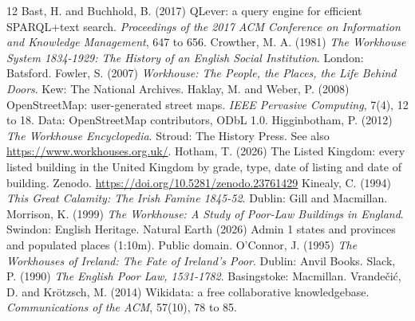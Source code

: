 \documentclass[11pt,a4paper]{article}
\begin{document}
\begin{thebibliography}{12}
 Bast, H. and Buchhold, B. (2017) QLever: a query engine for efficient SPARQL+text search. \emph{Proceedings of the 2017 ACM Conference on Information and Knowledge Management}, 647 to 656.
 Crowther, M. A. (1981) \emph{The Workhouse System 1834-1929: The History of an English Social Institution}. London: Batsford.
 Fowler, S. (2007) \emph{Workhouse: The People, the Places, the Life Behind Doors}. Kew: The National Archives.
 Haklay, M. and Weber, P. (2008) OpenStreetMap: user-generated street maps. \emph{IEEE Pervasive Computing}, 7(4), 12 to 18. Data: OpenStreetMap contributors, ODbL 1.0.
 Higginbotham, P. (2012) \emph{The Workhouse Encyclopedia}. Stroud: The History Press. See also \url{https://www.workhouses.org.uk/}.
 Hotham, T. (2026) The Listed Kingdom: every listed building in the United Kingdom by grade, type, date of listing and date of building. Zenodo. \url{https://doi.org/10.5281/zenodo.23761429}
 Kinealy, C. (1994) \emph{This Great Calamity: The Irish Famine 1845-52}. Dublin: Gill and Macmillan.
 Morrison, K. (1999) \emph{The Workhouse: A Study of Poor-Law Buildings in England}. Swindon: English Heritage.
 Natural Earth (2026) Admin 1 states and provinces and populated places (1:10m). Public domain.
 O'Connor, J. (1995) \emph{The Workhouses of Ireland: The Fate of Ireland's Poor}. Dublin: Anvil Books.
 Slack, P. (1990) \emph{The English Poor Law, 1531-1782}. Basingstoke: Macmillan.
 Vrande\v{c}i\'{c}, D. and Kr\"{o}tzsch, M. (2014) Wikidata: a free collaborative knowledgebase. \emph{Communications of the ACM}, 57(10), 78 to 85.
\end{thebibliography}
\end{document}
